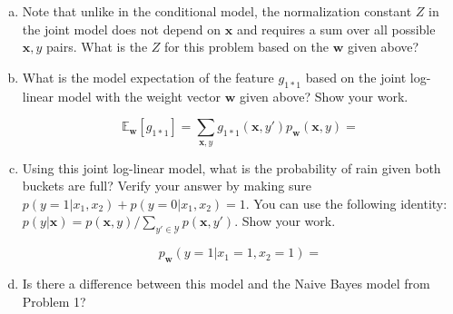 \documentclass[a4paper,fleqn]{article}
\renewcommand{\vec}{\mathbf}
\begin{document}
\begin{enumerate}[(a)]
\item Note that unlike in the conditional model, the normalization
  constant $Z$ in the joint model does not depend on $\vec{x}$ and
  requires a sum over all possible $\vec{x},y$ pairs.  What is the $Z$
  for this problem based on the $\vec{w}$ given above?

\vspace*{2cm}

\item What is the model expectation of the feature $g_{1*1}$ based on
  the joint log-linear model with the weight vector $\vec{w}$
  given above?  Show your work.

\[\mathbb{E}_{\vec{w}} [g_{1*1}] =
\sum_{\vec{x},y} g_{1*1}(\vec{x}, y') p_\vec{w}(\vec{x}, y) =
\]
\vspace*{2cm}

\item Using this joint log-linear model, what is the probability of
  rain given both buckets are full?  Verify your answer by making sure
  $p(y=1|x_1,x_2) + p(y=0|x_1,x_2) = 1$.  You can use the following
  identity: $ p(y|\vec{x}) =
  p(\vec{x},y)/\sum_{y'\in\mathcal{Y}}p(\vec{x},y')$.  Show your work.

\[ p_\vec{w}(y=1 | x_1=1, x_2=1)= \]
\vspace*{1cm}

\item Is there a difference between this model and the Naive Bayes
  model from Problem 1?
\end{enumerate}
\end{document}
